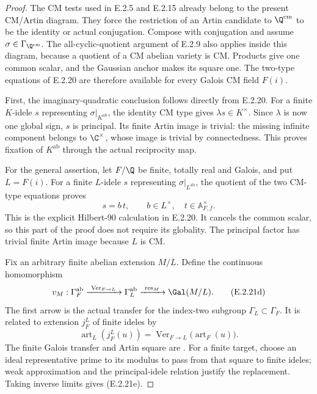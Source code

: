\begin{proof}
The CM tests used in E.2.5 and E.2.15 already belong
to the present CM/Artin diagram. They force the
restriction of an Artin candidate to
\(\Q^{\mathrm{cm}}\) to be the identity or actual
conjugation. Compose with conjugation and assume
\(\sigma\in\Gamma_{\Q^{\mathrm{cm}}}\).
The all-cyclic-quotient argument of E.2.9 also applies
inside this diagram, because a quotient of a CM
abelian variety is CM. Products give one common
scalar, and the Gaussian anchor makes its square
one. The two-type equations of E.2.20 are therefore
available for every Galois CM field \(F(i)\).

First, the imaginary-quadratic conclusion follows
directly from E.2.20. For a finite \(K\)-idele \(s\)
representing \(\sigma|_{K^{\mathrm{ab}}}\), the
identity CM type gives
\(\lambda s\in K^\times\). Since \(\lambda\) is now
one global sign, \(s\) is principal. Its finite
Artin image is trivial: the missing infinite
component belongs to \(\C^\times\), whose image
is trivial by connectedness. This proves fixation
of \(K^{\mathrm{ab}}\) through the actual reciprocity
map.

For the general assertion, let \(F/\Q\) be finite,
totally real and Galois, and put \(L=F(i)\).
For a finite \(L\)-idele \(s\) representing
\(\sigma|_{L^{\mathrm{ab}}}\), the quotient of the
two CM-type equations proves
\[
 s=b\,t,\qquad b\in L^\times,\quad
 t\in\mathbb A_{F,f}^{\times}.
 \tag{E.2.21c}
\]
This is the explicit Hilbert-90 calculation in
E.2.20. It cancels the common scalar, so this
part of the proof does not require its globality.
The principal factor has trivial finite Artin
image because \(L\) is CM.

Fix an arbitrary finite abelian extension \(M/L\).
Define the continuous homomorphism
\[
 v_M:\Gamma_F^{\mathrm{ab}}
   \xrightarrow{\ \operatorname{Ver}_{F\to L}\ }
   \Gamma_L^{\mathrm{ab}}
   \xrightarrow{\ \operatorname{res}_M\ }
   \Gal(M/L).
 \tag{E.2.21d}
\]
The first arrow is the actual transfer for the
index-two subgroup \(\Gamma_L\subset\Gamma_F\).
It is related to extension \(j_F^L\) of finite
ideles by
\[
 \operatorname{art}_L(j_F^L(u))
  =\operatorname{Ver}_{F\to L}
       \bigl(\operatorname{art}_F(u)\bigr).
 \tag{E.2.21e}
\]
The finite Galois transfer and Artin square are
\cite[Chapter V, Proposition 3.18 and adjoining
diagram, p.~162]{GenMilneCFT2020}.
For a finite target, choose an ideal representative
prime to its modulus to pass from that square to
finite ideles; weak approximation and the
principal-idele relation justify the replacement.
Taking inverse limits gives (E.2.21e).


\end{proof}
